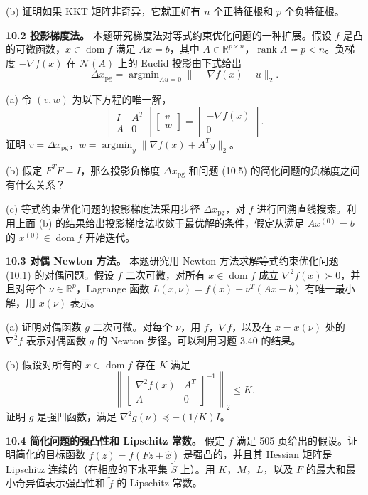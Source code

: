 \documentclass[UTF8, 12pt, fontset=fandol, oneside]{ctexart}
\begin{document}
(b) 证明如果 KKT 矩阵非奇异，它就正好有 $n$ 个正特征根和 $p$ 个负特征根。

\noindent\textbf{10.2 投影梯度法。}\quad
本题研究梯度法对等式约束优化问题的一种扩展。假设 $f$ 是凸的可微函数，$x\in\operatorname{dom} f$ 满足 $Ax=b$，其中 $A\in\mathbb{R}^{p\times n}$，$\operatorname{rank}A=p<n$。负梯度 $-\nabla f(x)$ 在 $\mathcal{N}(A)$ 上的 Euclid 投影由下式给出
\[
\Delta x_{\mathrm{pg}}=\mathop{\mathrm{argmin}}_{Au=0}\|-\nabla f(x)-u\|_2.
\]

(a) 令 $(v,w)$ 为以下方程的唯一解，
\[
\begin{bmatrix}
I&A^T\\
A&0
\end{bmatrix}
\begin{bmatrix}
v\\
w
\end{bmatrix}
=
\begin{bmatrix}
-\nabla f(x)\\
0
\end{bmatrix}.
\]
证明 $v=\Delta x_{\mathrm{pg}}$，$w=\mathop{\mathrm{argmin}}_y\|\nabla f(x)+A^Ty\|_2$。

(b) 假定 $F^TF=I$，那么投影负梯度 $\Delta x_{\mathrm{pg}}$ 和问题 (10.5) 的简化问题的负梯度之间有什么关系？

(c) 等式约束优化问题的投影梯度法采用步径 $\Delta x_{\mathrm{pg}}$，对 $f$ 进行回溯直线搜索。利用上面 (b) 的结果给出投影梯度法收敛于最优解的条件，假定从满足 $Ax^{(0)}=b$ 的 $x^{(0)}\in\operatorname{dom} f$ 开始迭代。

\noindent\textbf{10.3 对偶 Newton 方法。}\quad
本题研究用 Newton 方法求解等式约束优化问题 (10.1) 的对偶问题。假设 $f$ 二次可微，对所有 $x\in\operatorname{dom} f$ 成立 $\nabla^2 f(x)\succ0$，并且对每个 $\nu\in\mathbb{R}^p$，Lagrange 函数 $L(x,\nu)=f(x)+\nu^T(Ax-b)$ 有唯一最小解，用 $x(\nu)$ 表示。

(a) 证明对偶函数 $g$ 二次可微。对每个 $\nu$，用 $f$，$\nabla f$，以及在 $x=x(\nu)$ 处的 $\nabla^2 f$ 表示对偶函数 $g$ 的 Newton 步径。可以利用习题 3.40 的结果。

(b) 假设对所有的 $x\in\operatorname{dom} f$ 存在 $K$ 满足
\[
\left\|
\begin{bmatrix}
\nabla^2 f(x)&A^T\\
A&0
\end{bmatrix}^{-1}
\right\|_2\leq K.
\]
证明 $g$ 是强凹函数，满足 $\nabla^2 g(\nu)\preceq -(1/K)I$。

\noindent\textbf{10.4 简化问题的强凸性和 Lipschitz 常数。}\quad
假定 $f$ 满足 505 页给出的假设。证明简化的目标函数 $\tilde f(z)=f(Fz+\hat{x})$ 是强凸的，并且其 Hessian 矩阵是 Lipschitz 连续的（在相应的下水平集 $\tilde S$ 上）。用 $K$，$M$，$L$，以及 $F$ 的最大和最小奇异值表示强凸性和 $\tilde f$ 的 Lipschitz 常数。
\end{document}
